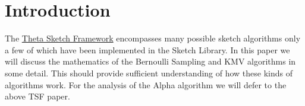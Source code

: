 %
\section{Introduction}
The \href{http://datasketches.github.io/docs/ThetaSketchFramework.pdf}{Theta Sketch Framework}
encompasses many possible sketch algorithms only a few of which have been implemented in the 
Sketch Library.  
In this paper we will discuss the mathematics of the Bernoulli Sampling and KMV algorithms in some detail.  This should provide sufficient understanding of how these kinds of algorithms work.  For the analysis of the Alpha algorithm we will defer to the above TSF paper. 